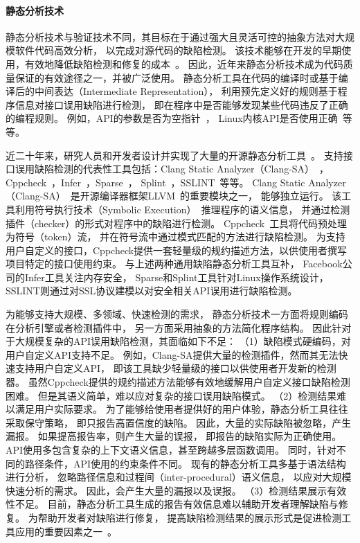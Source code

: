 \paragraph{静态分析技术}
静态分析技术与验证技术不同，其目标在于通过强大且灵活可控的抽象方法对大规模软件代码高效分析，
以完成对源代码的缺陷检测。
该技术能够在开发的早期使用，有效地降低缺陷检测和修复的成本~\cite{06-cost}。
因此，近年来静态分析技术成为代码质量保证的有效途径之一，并被广泛使用。
静态分析工具在代码的编译时或基于编译后的中间表达（Intermediate Representation），
利用预先定义好的规则基于程序信息对接口误用缺陷进行检测，
即在程序中是否能够发现某些代码违反了正确的编程规则。
例如，API的参数是否为空指针~\cite{00-osdi-npd}，
Linux内核API是否使用正确~\cite{09-dsn-linux}等等。

近二十年来，研究人员和开发者设计并实现了大量的开源静态分析工具~\cite{wiki-static-tool}。
支持接口误用缺陷检测的代表性工具包括：Clang Static Analyzer（Clang-SA）~\cite{clang-sa}，
Cppcheck~\cite{cppcheck}，Infer~\cite{infer}，Sparse~\cite{sparse}，
Splint~\cite{splint}，SSLINT~\cite{15-sp-sslint}等等。
Clang Static Analyzer（Clang-SA）~\cite{clang-sa}是开源编译器框架LLVM~\cite{llvm}的重要模块之一，
能够独立运行。
该工具利用符号执行技术（Symbolic Execution）~\cite{13-acm-se}推理程序的语义信息，
并通过检测插件（checker）的形式对程序中的缺陷进行检测。
Cppcheck~\cite{cppcheck}工具将代码预处理为符号（token）流，
并在符号流中通过模式匹配的方法进行缺陷检测。
为支持用户自定义的接口，Cppcheck提供一套轻量级的规约描述方法，以供使用者撰写项目特定的接口使用约束。
与上述两种通用缺陷静态分析工具互补，
Facebook公司的Infer工具关注内存安全，
Sparse和Splint工具针对Linux操作系统设计，
SSLINT则通过对SSL协议建模以对安全相关API误用进行缺陷检测。


为能够支持大规模、多领域、快速检测的需求，
静态分析技术一方面将规则编码在分析引擎或者检测插件中，
另一方面采用抽象的方法简化程序结构。
因此针对于大规模复杂的API误用缺陷检测，其面临如下不足：
（1）缺陷模式硬编码，对用户自定义API支持不足。
例如，Clang-SA提供大量的检测插件，然而其无法快速支持用户自定义API，
即该工具缺少轻量级的接口以供使用者开发新的检测器。
虽然Cppcheck提供的规约描述方法能够有效地缓解用户自定义接口缺陷检测困难。
但是其语义简单，难以应对复杂的接口误用缺陷模式。
（2）检测结果难以满足用户实际要求。
为了能够给使用者提供好的用户体验，静态分析工具往往采取保守策略，
即只报告高置信度的缺陷。
因此，大量的实际缺陷被忽略，产生漏报。
如果提高报告率，则产生大量的误报，
即报告的缺陷实际为正确使用。
API使用多包含复杂的上下文语义信息，甚至跨越多层函数调用。
同时，针对不同的路径条件，API使用的约束条件不同。
现有的静态分析工具多基于语法结构进行分析，
忽略路径信息和过程间（inter-procedural）语义信息，
以应对大规模快速分析的需求。
因此，会产生大量的漏报以及误报。
（3）检测结果展示有效性不足。
目前，静态分析工具生成的报告有效信息难以辅助开发者理解缺陷与修复。
为帮助开发者对缺陷进行修复，
提高缺陷检测结果的展示形式是促进检测工具应用的重要因素之一~\cite{13-icse-donotuse}。

